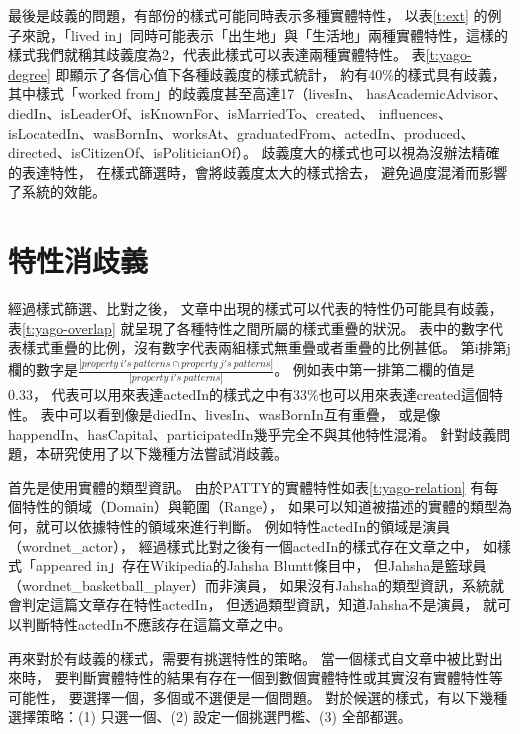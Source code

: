 最後是歧義的問題，有部份的樣式可能同時表示多種實體特性，
以表\ref{t:ext} 的例子來說，「lived in」同時可能表示「出生地」與「生活地」兩種實體特性，這樣的樣式我們就稱其歧義度為2，代表此樣式可以表達兩種實體特性。
表\ref{t:yago-degree} 即顯示了各信心值下各種歧義度的樣式統計，
約有40\%的樣式具有歧義，其中樣式「worked from」的歧義度甚至高達17（livesIn、
hasAcademicAdvisor、diedIn、isLeaderOf、isKnownFor、isMarriedTo、created、
influences、isLocatedIn、wasBornIn、worksAt、graduatedFrom、actedIn、produced、
directed、isCitizenOf、isPoliticianOf）。
歧義度大的樣式也可以視為沒辦法精確的表達特性，
在樣式篩選時，會將歧義度太大的樣式捨去，
避免過度混淆而影響了系統的效能。



\section{特性消歧義}
\label{s:pattern-disambiguity}

經過樣式篩選、比對之後，
文章中出現的樣式可以代表的特性仍可能具有歧義，
表\ref{t:yago-overlap} 就呈現了各種特性之間所屬的樣式重疊的狀況。
表中的數字代表樣式重疊的比例，沒有數字代表兩組樣式無重疊或者重疊的比例甚低。
第i排第j欄的數字是$\frac{|property\ i's\ patterns \cap property\ j's\ patterns|}{|property\ i's\ patterns|}$。
例如表中第一排第二欄的值是0.33，
代表可以用來表達actedIn的樣式之中有33\%也可以用來表達created這個特性。
表中可以看到像是diedIn、livesIn、wasBornIn互有重疊，
或是像happendIn、hasCapital、participatedIn幾乎完全不與其他特性混淆。
針對歧義問題，本研究使用了以下幾種方法嘗試消歧義。



首先是使用實體的類型資訊。
由於PATTY的實體特性如表\ref{t:yago-relation} 有每個特性的領域（Domain）與範圍（Range），
如果可以知道被描述的實體的類型為何，就可以依據特性的領域來進行判斷。
例如特性actedIn的領域是演員（wordnet\_actor），
經過樣式比對之後有一個actedIn的樣式存在文章之中，
如樣式「appeared in」存在Wikipedia的Jahsha Bluntt條目中，
但Jahsha是籃球員（wordnet\_basketball\_player）而非演員，
如果沒有Jahsha的類型資訊，系統就會判定這篇文章存在特性actedIn，
但透過類型資訊，知道Jahsha不是演員，
就可以判斷特性actedIn不應該存在這篇文章之中。

再來對於有歧義的樣式，需要有挑選特性的策略。
當一個樣式自文章中被比對出來時，
要判斷實體特性的結果有存在一個到數個實體特性或其實沒有實體特性等可能性，
要選擇一個，多個或不選便是一個問題。
對於候選的樣式，有以下幾種選擇策略：(1) 只選一個、(2) 設定一個挑選門檻、(3) 全部都選。


